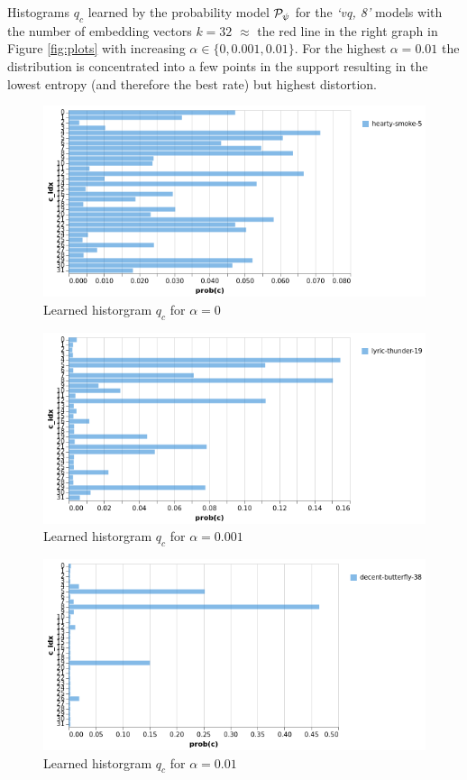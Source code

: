 \documentclass{article} %
\newcommand{\qc}{q_c}
\newcommand{\gPp}{\gP_{\psi}}
\begin{document}
Histograms $\qc$ learned by the probability model $\gPp$ for the \emph{`vq, 8'} models with the number of embedding vectors $k=32$ $\approx$ the red line in the right graph in Figure \ref{fig:plots} with increasing $\alpha \in \{0, 0.001, 0.01\}$.
For the highest $\alpha = 0.01$ the distribution is concentrated into a few points in the support resulting in the lowest entropy (and therefore the best rate) but highest distortion.

\begin{figure}[h]
\begin{center}
\includegraphics[scale=0.5]{pics/hist_vq8_k32_alpha0.png}
\end{center}
\caption{Learned historgram $\qc$ for $\alpha = 0$}
\end{figure}
\begin{figure}[h]
\begin{center}
\includegraphics[scale=0.5]{pics/hist_vq8_k32_alpha0_001.png}
\end{center}
\caption{Learned historgram $\qc$ for $\alpha = 0.001$}
\end{figure}
\begin{figure}[h]
\begin{center}
\includegraphics[scale=0.5]{pics/hist_vq8_k32_alpha0_01.png}
\end{center}
\caption{Learned historgram $\qc$ for $\alpha = 0.01$}
\end{figure}
\end{document}
